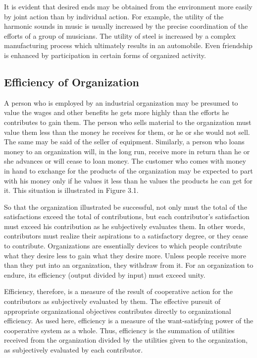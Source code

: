 It is evident that desired ends may be obtained from the environment more easily by joint action than by individual action. For example, the utility of the harmonic sounds in music is usually increased by the precise coordination of the efforts of a group of musicians. The utility of steel is increased by a complex manufacturing process which ultimately results in an automobile. Even friendship is enhanced by participation in certain forms of organized activity.

\subsection{Efficiency of Organization}

A person who is employed by an industrial organization may be presumed to value the wages and other benefits he gets more highly than the efforts he contributes to gain them. The person who sells material to the organization must value them less than the money he receives for them, or he or she would not sell. The same may be said of the seller of equipment. Similarly, a person who loans money to an organization will, in the long run, receive more in return than he or she advances or will cease to loan money. The customer who comes with money in hand to exchange for the products of the organization may be expected to part with his money only if he values it less than he values the products he can get for it. This situation is illustrated in Figure 3.1.

So that the organization illustrated be successful, not only must the total of the satisfactions exceed the total of contributions, but each contributor’s satisfaction must exceed his contribution as he subjectively evaluates them. In other words, contributors must realize their aspirations to a satisfactory degree, or they cease to contribute. Organizations are essentially devices to which people contribute what they desire less to gain what they desire more. Unless people receive more than they put into an organization, they withdraw from it. For an organization to endure, its efficiency (output divided by input) must exceed unity.

Efficiency, therefore, is a measure of the result of cooperative action for the contributors as subjectively evaluated by them. The effective pursuit of appropriate organizational objectives contributes directly to organizational efficiency. As used here, efficiency is a measure of the want-satisfying power of the cooperative system as a whole. Thus, efficiency is the summation of utilities received from the organization divided by the utilities given to the organization, as subjectively evaluated by each contributor.

